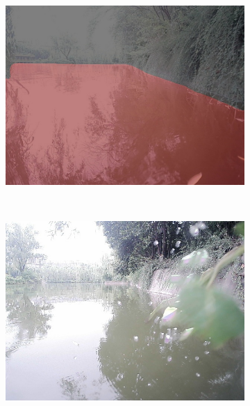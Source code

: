 \documentclass[cn,12pt,color=mine,scheme=chinese,bibstyle=gb7714-2015]{elegantbook}
\begin{document}
\begin{figure}[h]
\begin{subfigure}[b]{0.23\linewidth}
	\end{subfigure}
	\begin{subfigure}[b]{0.23\linewidth}
		\centering\includegraphics[width=\linewidth]{results2/test3segformer}
	\end{subfigure}\\
	\vspace{1mm}
	\begin{subfigure}[b]{0.23\linewidth}
		\centering\includegraphics[width=\linewidth]{results2/test5}
	\end{subfigure}
	\begin{subfigure}[b]{0.23\linewidth}

\end{subfigure}
\end{figure}
\end{document}
